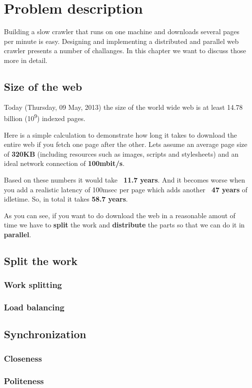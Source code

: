 \chapter{Problem description} %
Building a slow crawler that runs on one machine and downloads several pages per minute is easy. Designing and implementing a distributed and parallel web crawler presents a number of challanges. In this chapter we want to discuss those more in detail.

\label{Chapter3} %


\section{Size of the web}
Today (Thursday, 09 May, 2013) the size of the world wide web is at least 14.78 billion (10\textsuperscript{9}) indexed pages.\cite{wwwsize}

Here is a simple calculation to demonstrate how long it takes to download the entire web if you fetch one page after the other.
Lets assume an average page size of \textbf{320KB} \cite{webmetrics} (including resources such as images, scripts and stylesheets) and an ideal network connection of \textbf{100mbit/s}.

Based on these numbers it would take \textbf{~11.7 years}. And it becomes worse when you add a realistic latency of 100msec per page which adds another \textbf{~47 years} of idletime. So, in total it takes \textbf{58.7 years}.

As you can see, if you want to do download the web in a reasonable amout of time we have to \textbf{split} the work and \textbf{distribute} the parts so that we can do it in \textbf{parallel}.

\section{Split the work}
\subsection{Work splitting}
\subsection{Load balancing}

\section{Synchronization}
\subsection{Closeness}
\subsection{Politeness}

